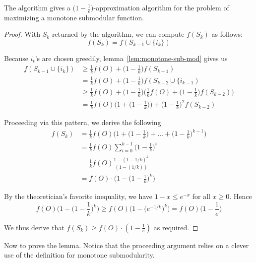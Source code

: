 \documentclass{article}
\begin{document}
\begin{theorem}
The algorithm gives a $\big( 1 - \frac{1}{e} \big)$-approximation algorithm for the problem of maximizing a monotone submodular function.
\end{theorem}
\begin{proof}
With $S_k$ returned by the algorithm, we can compute $f(S_k)$ as follows:
\begin{equation*}
f(S_k) = f(S_{k-1} \cup \{ i_k \})
\end{equation*}

Because $i_t$'s are chosen greedily, lemma~\ref{lem:monotone-sub-mod} gives us
\begin{align*}
f(S_{k-1} \cup \{ i_k \})
&\geq \frac{1}{k} f(O) + \bigg( 1 - \frac{1}{k} \bigg) f(S_{k-1}) \\
&= \frac{1}{k} f(O) + \bigg( 1 - \frac{1}{k} \bigg) f(S_{k-2} \cup \{ i_{k-1}) \\
&\geq \frac{1}{k} f(O) + \bigg( 1 - \frac{1}{k} \bigg) \bigg( \frac{1}{k} f(O) + \bigg( 1 - \frac{1}{k} \bigg) f(S_{k-2}) \bigg) \\
&= \frac{1}{k} f(O) \bigg( 1 + \bigg( 1 - \frac{1}{k} \bigg) \bigg) + \bigg( 1 - \frac{1}{k} \bigg)^2 f(S_{k-2})
\end{align*}

Proceeding via this pattern, we derive the following
\begin{align*}
f(S_k)
&= \frac{1}{k} f(O) \bigg( 1 + \bigg( 1 - \frac{1}{k} \bigg) + \ldots + \bigg( 1 - \frac{1}{k} \bigg)^{k-1} \bigg) \\
&= \frac{1}{k} f(O) \sum_{i=0}^{k-1} \bigg( 1 - \frac{1}{k} \bigg)^i \\
&= \frac{1}{k} f(O) \frac{1 - (1 - 1/k)^k}{(1 - (1/k))} \\
&= f(O) \cdot \bigg( 1 - \bigg( 1 - \frac{1}{k} \bigg)^k \bigg)
\end{align*}

By the theoretician's favorite inequality, we have $1 - x \leq e^{-x}$ for all $x \geq 0$. Hence
\begin{equation*}
f(O) \bigg( 1 - \bigg( 1 - \frac{1}{k} \bigg)^k \bigg)
\geq f(O) \Big( 1 - \big( e^{-1/k} \big)^k \Big)
= f(O) \bigg( 1 - \frac{1}{e} \bigg)
\end{equation*}

We thus derive that $f(S_k) \geq f(O) \cdot (1 - \frac{1}{e})$ as required.
\end{proof}

Now to prove the lemma. Notice that the proceeding argument relies on a clever use of the definition for monotone submodularity.
\end{document}
